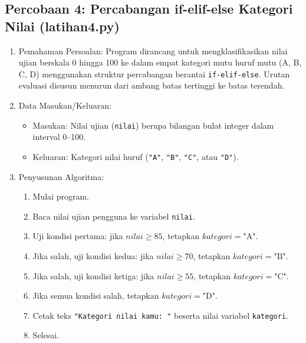 \documentclass[12pt,a4paper]{article}
\begin{document}
\subsection{Percobaan 4: Percabangan if-elif-else Kategori Nilai (latihan4.py)}
\begin{enumerate}
    \item Pemahaman Persoalan: Program dirancang untuk mengklasifikasikan nilai ujian berskala 0 hingga 100 ke dalam empat kategori mutu huruf mutu (A, B, C, D) menggunakan struktur percabangan berantai \texttt{if-elif-else}. Urutan evaluasi disusun menurun dari ambang batas tertinggi ke batas terendah.
    \item Data Masukan/Keluaran:
    \begin{itemize}
        \item Masukan: Nilai ujian (\texttt{nilai}) berupa bilangan bulat integer dalam interval 0--100.
        \item Keluaran: Kategori nilai huruf (\texttt{"A"}, \texttt{"B"}, \texttt{"C"}, atau \texttt{"D"}).
    \end{itemize}
    \item Penyusunan Algoritma:
    \begin{enumerate}[label=\alph*.]
        \item Mulai program.
        \item Baca nilai ujian pengguna ke variabel \texttt{nilai}.
        \item Uji kondisi pertama: jika $nilai \ge 85$, tetapkan $kategori = \text{"A"}$.
        \item Jika salah, uji kondisi kedua: jika $nilai \ge 70$, tetapkan $kategori = \text{"B"}$.
        \item Jika salah, uji kondisi ketiga: jika $nilai \ge 55$, tetapkan $kategori = \text{"C"}$.
        \item Jika semua kondisi salah, tetapkan $kategori = \text{"D"}$.
        \item Cetak teks \texttt{"Kategori nilai kamu: "} beserta nilai variabel \texttt{kategori}.
        \item Selesai.
    \end{enumerate}
\end{enumerate}
\end{document}
